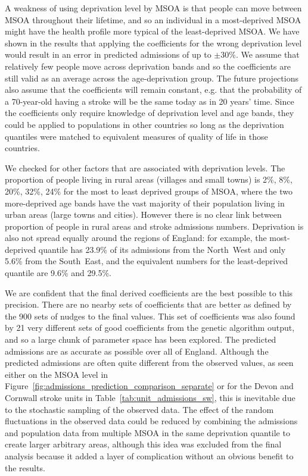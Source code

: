 \documentclass[12pt]{extarticle}
\begin{document}
A weakness of using deprivation level by MSOA is that people can move between MSOA throughout their lifetime, and so an individual in a most-deprived MSOA might have the health profile more typical of the least-deprived MSOA. 
We have shown in the results that applying the coefficients for the wrong deprivation level would result in an error in predicted admissions of up to $\pm$30\%.
We assume that relatively few people move across deprivation bands and so the coefficients are still valid as an average across the age-deprivation group.
% 
The future projections also assume that the coefficients will remain constant, e.g. that the probability of a 70-year-old having a stroke will be the same today as in 20 years' time.
%
Since the coefficients only require knowledge of deprivation level and age bands, they could be applied to populations in other countries so long as the deprivation quantiles were matched to equivalent measures of quality of life in those countries.


We checked for other factors that are associated with deprivation levels.
% 
The proportion of people living in rural areas (villages and small towns) is 2\%, 8\%, 20\%, 32\%, 24\% for the most to least deprived groups of MSOA, where the two more-deprived age bands have the vast majority of their population living in urban areas (large towns and cities).
However there is no clear link between proportion of people in rural areas and stroke admissions numbers.
% 
Deprivation is also not spread equally around the regions of England: for example, the most-deprived quantile has 23.9\% of its admissions from the North~West and only 5.6\% from the South~East, and the equivalent numbers for the least-deprived quantile are 9.6\% and 29.5\%.


We are confident that the final derived coefficients are the best possible to this precision.
There are no nearby sets of coefficients that are better as defined by the 900 sets of nudges to the final values.
This set of coefficients was also found by 21 very different sets of good coefficients from the genetic algorithm output, and so a large chunk of parameter space has been explored.
% 
The predicted admissions are as accurate as possible over all of England.
Although the predicted admissions are often quite different from the observed values, as seen either on the MSOA level in Figure~\ref{fig:admissions_prediction_comparison_separate} or for the Devon and Cornwall stroke units in Table~\ref{tab:unit_admissions_sw}, this is inevitable due to the stochastic sampling of the observed data.
% 
The effect of the random fluctuations in the observed data could be reduced by combining the admissions and population data from multiple MSOA in the same deprivation quantile to create larger arbitrary areas, although this idea was excluded from the final analysis because it added a layer of complication without an obvious benefit to the results.
\end{document}
